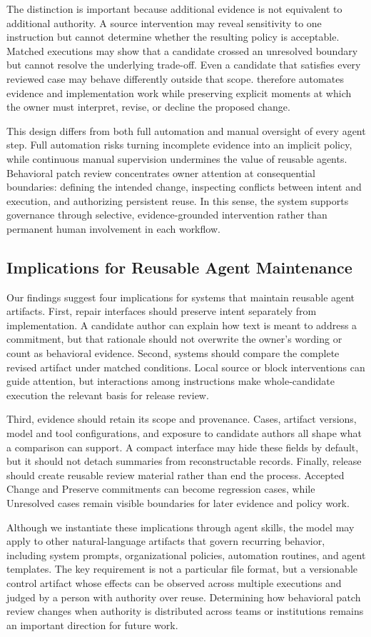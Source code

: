 The distinction is important because additional evidence is not equivalent to
additional authority. A source intervention may reveal sensitivity to one
instruction but cannot determine whether the resulting policy is acceptable.
Matched executions may show that a candidate crossed an unresolved boundary
but cannot resolve the underlying trade-off. Even a candidate that satisfies
every reviewed case may behave differently outside that scope. \systemname{}
therefore automates evidence and implementation work while preserving explicit
moments at which the owner must interpret, revise, or decline the proposed
change.

This design differs from both full automation and manual oversight of every
agent step. Full automation risks turning incomplete evidence into an implicit
policy, while continuous manual supervision undermines the value of reusable
agents. Behavioral patch review concentrates owner attention at consequential
boundaries: defining the intended change, inspecting conflicts between intent
and execution, and authorizing persistent reuse. In this sense, the system
supports governance through selective, evidence-grounded intervention rather
than permanent human involvement in each workflow.

\subsection{Implications for Reusable Agent Maintenance}

Our findings suggest four implications for systems that maintain reusable
agent artifacts. First, repair interfaces should preserve intent separately
from implementation. A candidate author can explain how text is meant to
address a commitment, but that rationale should not overwrite the owner's
wording or count as behavioral evidence. Second, systems should compare the
complete revised artifact under matched conditions. Local source or block
interventions can guide attention, but interactions among instructions make
whole-candidate execution the relevant basis for release review.

Third, evidence should retain its scope and provenance. Cases, artifact
versions, model and tool configurations, and exposure to candidate authors all
shape what a comparison can support. A compact interface may hide these fields
by default, but it should not detach summaries from reconstructable records.
Finally, release should create reusable review material rather than end the
process. Accepted Change and Preserve commitments can become regression cases,
while Unresolved cases remain visible boundaries for later evidence and policy
work.

Although we instantiate these implications through agent skills, the model may
apply to other natural-language artifacts that govern recurring behavior,
including system prompts, organizational policies, automation routines, and
agent templates. The key requirement is not a particular file format, but a
versionable control artifact whose effects can be observed across multiple
executions and judged by a person with authority over reuse. Determining how
behavioral patch review changes when authority is distributed across teams or
institutions remains an important direction for future work.
